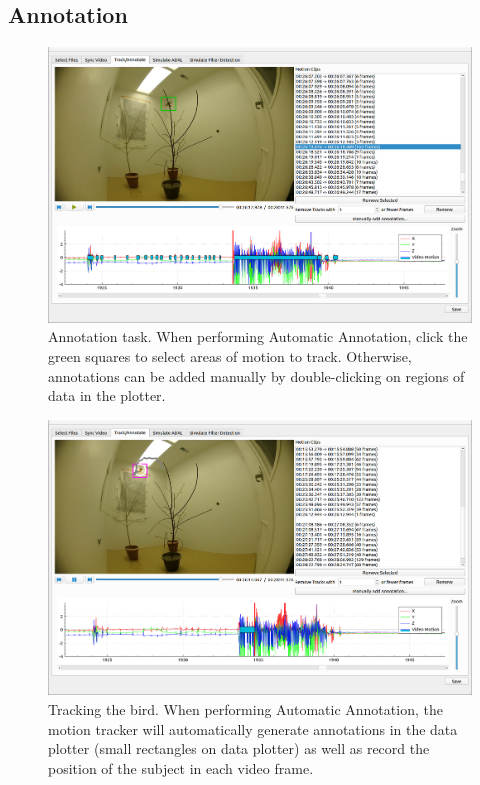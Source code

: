 \documentclass[]{article}
\begin{document}
	\subsection{Annotation}
	\begin{figure}[H]
		\centering
		\includegraphics[width=1\linewidth]{selectbird}
		\caption{Annotation task. When performing Automatic Annotation, click the green squares to select areas of motion to track. Otherwise, annotations can be added manually by double-clicking on regions of data in the plotter.}
		\label{fig:annotate}
	\end{figure}
	
	\begin{figure}[H]
		\centering
		\includegraphics[width=1\linewidth]{tracking}
		\caption{Tracking the bird. When performing Automatic Annotation, the motion tracker will automatically generate annotations in the data plotter (small rectangles on data plotter) as well as record the position of the subject in each video frame.}
		\label{fig:tracking}
	\end{figure}
	
\end{document}
